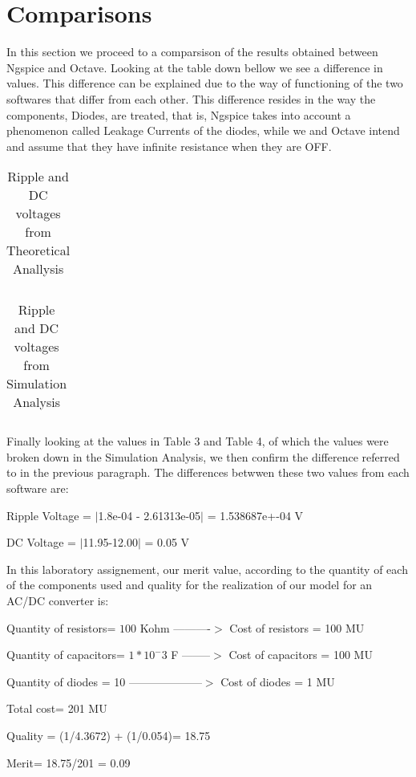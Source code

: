 \section{Comparisons}
\label{sec:comparsisons}

In this section we proceed to a comparsison of the results obtained between Ngspice and Octave. Looking at the table down bellow we see a difference in values. This difference can be explained due to the way of functioning of the two softwares that differ from each other. This difference resides in the way the components, Diodes, are treated, that is, Ngspice takes into account a phenomenon called Leakage Currents of the diodes, while we and Octave intend and assume that they have infinite resistance when they are OFF. 

\FloatBarrier
\begin{table}[h]
  \centering
  \begin{tabular}{|c|c|c|c|c|c|c|}
    \hline    
    
    \hline
  \end{tabular}
  \caption{Ripple and DC voltages from Theoretical Anallysis}
  \label{tab:Octave}
\end{table}
\FloatBarrier 

\FloatBarrier
\begin{table}[h]
  \centering
  \begin{tabular}{|c|c|c|}
    \hline    
    
    \hline
  \end{tabular}
  \caption{Ripple and DC voltages from Simulation Analysis}
  \label{tab:Octave}
\end{table}
\FloatBarrier 

Finally looking at the values in Table 3 and Table 4, of which the values were broken down in the Simulation Analysis, we then confirm the difference referred to in the previous paragraph. The differences betwwen these two values from each software are: 

\par Ripple Voltage = $|$1.8e-04 - 2.61313e-05$|$ = 1.538687e+-04 V
\par DC Voltage = $|$11.95-12.00$|$ = 0.05 V
\vspace{0.5cm}

In this laboratory assignement, our merit value, according to the quantity of each of the components used and quality for the realization of our model for an AC/DC converter is: 

\par Quantity of resistors= $100$ Kohm ----------$>$ Cost of resistors = 100 MU 
\par Quantity of capacitors= $1*10^-3$ F --------$>$ Cost of capacitors = 100 MU 
\par Quantity of diodes = 10 --------------------$>$ Cost of diodes = 1 MU  
\par Total cost= 201 MU

\par Quality = (1/4.3672) + (1/0.054)= 18.75 

\par Merit= 18.75/201 = 0.09

